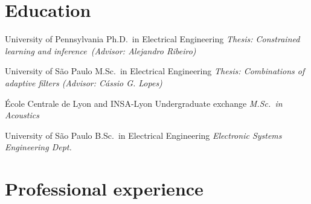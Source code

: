 \documentclass{cvlfoc}
\begin{document}
\section*{Education}

\begin{entrydate}
		{University of Pennsylvania}
		{Ph.D.\ in Electrical Engineering}
		{\emph{Thesis: Constrained learning and inference~(Advisor: Alejandro Ribeiro)}}

		{University of S\~{a}o Paulo}
		{M.Sc.\ in Electrical Engineering}
		{\emph{Thesis: Combinations of adaptive filters (Advisor: C\'{a}ssio G. Lopes)}}

		{École Centrale de Lyon {\normalfont and} INSA-Lyon}
		{Undergraduate exchange}
		{\textit{M.Sc.\ in Acoustics}}

		{University of S\~{a}o Paulo}
		{B.Sc.\ in Electrical Engineering}
		{\textit{Electronic Systems Engineering Dept.}}
\end{entrydate}



\section*{Professional experience}
\end{document}
